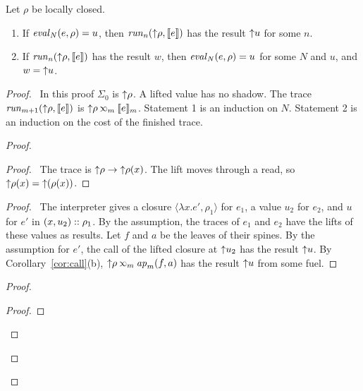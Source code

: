 \begin{thm}[Adequacy]\label{thm:adequacy}
  Let $\rho$ be locally closed.
  \begin{enumerate}
    \item If $\mathit{eval}_{N}(e,\rho)=u$, then $\mathit{run}_{n}({\uparrow}{\rho},\llbracket{e}\rrbracket)$ has the result ${\uparrow}{u}$ for some $n$.
    \item If $\mathit{run}_{n}({\uparrow}{\rho},\llbracket{e}\rrbracket)$ has the result $w$, then $\mathit{eval}_{N}(e,\rho)=u$ for some $N$ and $u$, and $w={\uparrow}{u}$.
  \end{enumerate}
\end{thm}
\begin{proof}
  \pfsketch\ In this proof $\Sigma_0$ is ${\uparrow}{\rho}$.
  A lifted value has no shadow.
  The trace $\mathit{run}_{m+1}({\uparrow}{\rho},\llbracket{e}\rrbracket)$ is $\lift{\rho}\lk{m}\den{e}{m}$.
  Statement 1 is an induction on $N$.
  Statement 2 is an induction on the cost of the finished trace.
  \begin{proof}
    \begin{proof}
      \pf\ The trace is ${{\uparrow}{\rho}}\rightarrow{{\uparrow}{\rho}(x)}$.
      The lift moves through a read, so ${\uparrow}{\rho}(x)={\uparrow}{(\rho(x))}$.
    \end{proof}
    \begin{proof}
      \pf\ The interpreter gives a closure $\langle\lambda x.e',\rho_1\rangle$ for $e_1$, a value $u_2$ for $e_2$, and $u$ for $e'$ in $(x,u_2)::\rho_1$.
      By the assumption, the traces of $e_1$ and $e_2$ have the lifts of these values as results.
      Let $f$ and $a$ be the leaves of their spines.
      By the assumption for $e'$, the call of the lifted closure at ${\uparrow}{u_2}$ has the result ${\uparrow}{u}$.
      By Corollary~\ref{cor:call}(b), $\lift{\rho}\lk{m}\apf{m}(f,a)$ has the result ${\uparrow}{u}$ from some fuel.
    \end{proof}
    \begin{proof}
      \begin{proof}

\end{proof}
\end{proof}
\end{proof}
\end{proof}
